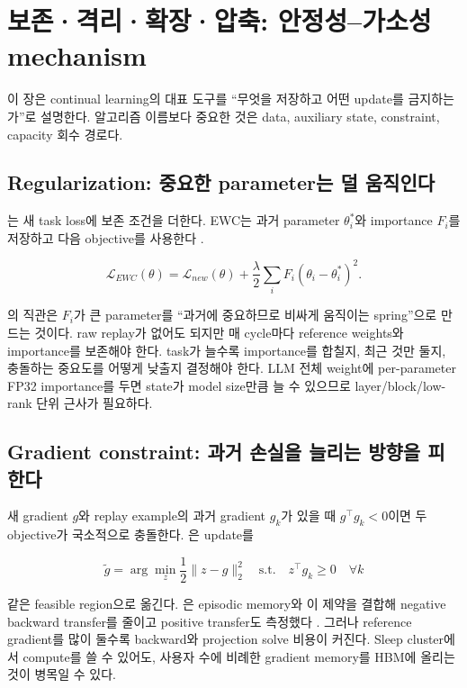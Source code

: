 \chapter{보존·격리·확장·압축: 안정성–가소성 mechanism}
\label{bg:chapter-stability-methods}

이 장은 continual learning의 대표 도구를 ``무엇을 저장하고 어떤 update를 금지하는가''로 설명한다.
알고리즘 이름보다 중요한 것은 data, auxiliary state, constraint, capacity 회수 경로다.

\section{Regularization: 중요한 parameter는 덜 움직인다}

는 새 task loss에 보존 조건을 더한다. EWC는 과거 parameter
$\theta_i^*$와 importance $F_i$를 저장하고 다음 objective를 사용한다
\parencite{kirkpatrick2017ewc}.

\begin{equation}
\mathcal{L}_{EWC}(\theta)=\mathcal{L}_{new}(\theta)+
\frac{\lambda}{2}\sum_i F_i(\theta_i-\theta_i^*)^2.
\end{equation}

의 직관은 $F_i$가 큰 parameter를 ``과거에 중요하므로 비싸게 움직이는
spring''으로 만드는 것이다. raw replay가 없어도 되지만 매 cycle마다 reference weights와 importance를
보존해야 한다. task가 늘수록 importance를 합칠지, 최근 것만 둘지, 충돌하는 중요도를 어떻게 낮출지
결정해야 한다. LLM 전체 weight에 per-parameter FP32 importance를 두면 state가 model size만큼 늘 수
있으므로 layer/block/low-rank 단위 근사가 필요하다.

\section{Gradient constraint: 과거 손실을 늘리는 방향을 피한다}

새 gradient $g$와 replay example의 과거 gradient $g_k$가 있을 때 $g^\top g_k<0$이면 두 objective가
국소적으로 충돌한다. 은 update를

\begin{equation}
\tilde g=\arg\min_z \frac12\lVert z-g\rVert_2^2
\quad \text{s.t.}\quad z^\top g_k\ge 0\quad \forall k
\end{equation}

같은 feasible region으로 옮긴다. 은 episodic memory와 이 제약을 결합해
negative backward transfer를 줄이고 positive transfer도 측정했다 \parencite{lopezpaz2017gem}.
그러나 reference gradient를 많이 둘수록 backward와 projection solve 비용이 커진다. Sleep cluster에서
compute를 쓸 수 있어도, 사용자 수에 비례한 gradient memory를 HBM에 올리는 것이 병목일 수 있다.

